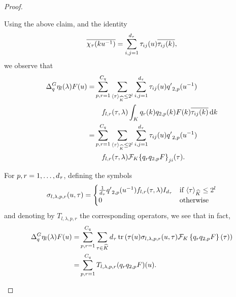 \begin{proof}
\begin{description}
            Using the above claim,
            and the identity
            \begin{align*}
                \conj{\Character{\tau}(k u^{-1})} = \sum_{i, j = 1}^\dimRep{\tau} \tau_{ij}(u) \conj{{\tau_{ij}(k)}},
            \end{align*}
            we observe that
            \begin{align}
                \DifferenceOperator{q} \eta_l (\lambda) F(u)
                = &\sum_{p, r = 1}^{C_q}
                    \sum_{\JapaneseBracket{\CompactGroup}{\tau} \leq 2^l}
                        \sum_{i, j = 1}^\dimRep{\tau}\notag
                            \tau_{ij}(u) {q'}_{2, p}(u^{-1})\\
                            &\quad f_{l, r}(\tau, \lambda)
                            \int_\CompactGroup
                                q_{r}(k) q_{2, p}(k) F(k) \conj{\tau_{ij}(k)}
                            \dd k
                            \label{eq:theorem:Littlewood-Paley_decomposition:exact_expression_for_operator}\\
                = &\sum_{p, r = 1}^{C_q}
                    \sum_{\JapaneseBracket{\CompactGroup}{\tau} \leq 2^l}
                        \sum_{i, j = 1}^\dimRep{\tau}
                            \tau_{ij}(u) {q'}_{2, p}(u^{-1})\notag\\
                            &\quad f_{l, r}(\tau, \lambda)
                            \Fourier[\CompactGroup]{} {\left\{ q_{r} q_{2, p} F\right\}}_{j i}(\tau).\notag
            \end{align}

            For $p, r = 1, \dots, \dimRep{\tau}$, defining the symbols
            \begin{align}
                \sigma_{l, \lambda, p, r}(u, \tau) =
                \begin{cases}
                    \frac{1}{\dimRep{\tau}} {q'}_{2, p}(u^{-1}) f_{l, r}(\tau, \lambda) \Id{\dimRep{\tau}} & \text{if } \JapaneseBracket{\CompactGroup}{\tau} \leq 2^l\\
                    0 & \text{otherwise}
                \end{cases}
            \end{align}
            and denoting by $T_{l, \lambda, p, r}$ the corresponding operators,
            we see that in fact,
            \begin{align*}
                \DifferenceOperator{q} \eta_l (\lambda) F(u)
                = &\sum_{p, r = 1}^{C_q}
                    \sum_{\tau \in \dualGroup{\CompactGroup}}
                        \dimRep{\tau}
                        \tr \left(
                            \tau(u)
                            \sigma_{l, \lambda, p, r}(u, \tau)
                            \Fourier[\CompactGroup]{} \left\{ q_r q_{2, p} F\right\}(\tau)
                        \right)\\
                = &\sum_{p, r = 1}^{C_q}
                        T_{l, \lambda, p, r} (q_r q_{2, p} F)(u).
            \end{align*}


\end{description}
\end{proof}
